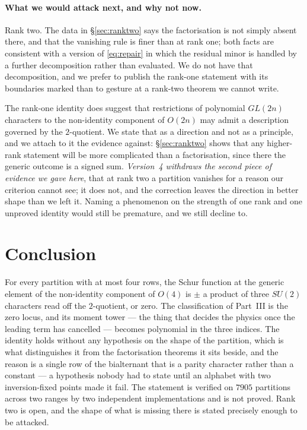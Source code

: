 \documentclass[11pt,a4paper]{article}
\begin{document}
\paragraph{What we would attack next, and why not now.} Rank two. The data in
\S\ref{sec:ranktwo} says the factorisation is not simply absent there, and that the vanishing
rule is finer than at rank one; both facts are consistent with a version of \eqref{eq:repair}
in which the residual minor is handled by a further decomposition rather than evaluated. We do
not have that decomposition, and we prefer to publish the rank-one statement with its
boundaries marked than to gesture at a rank-two theorem we cannot write.

The rank-one identity does suggest that restrictions of polynomial $GL(2n)$ characters to the
non-identity component of $O(2n)$ may admit a description governed by the $2$-quotient. We
state that as a direction and not as a principle, and we attach to it the evidence against:
\S\ref{sec:ranktwo} shows that any higher-rank statement will be more complicated than a
factorisation, since there the generic outcome is a signed sum. \emph{Version~4 withdraws the
second piece of evidence we gave here}, that at rank two a partition vanishes for a reason our
criterion cannot see; it does not, and the correction leaves the direction in better shape than we
left it. Naming a phenomenon on the strength of one rank and one unproved identity would still be
premature, and we still decline to.

\section{Conclusion}\label{sec:conclusion}

For every partition with at most four rows, the Schur function at the generic element of the
non-identity component of $O(4)$ is $\pm$ a product of three $SU(2)$ characters read off the
$2$-quotient, or zero. The classification of Part~III is the zero locus, and its moment
tower --- the thing that decides the physics once the leading term has cancelled --- becomes
polynomial in the three indices. The identity holds
without any hypothesis on the shape of the partition, which is what distinguishes it from the
factorisation theorems it sits beside, and the reason is a single row of the bialternant that
is a parity character rather than a constant --- a hypothesis nobody had to state until an
alphabet with two inversion-fixed points made it fail. The statement is verified on $7905$
partitions across two ranges by two independent implementations and is not proved. Rank two is
open, and the shape of what is missing there is stated precisely enough to be attacked.
\end{document}
